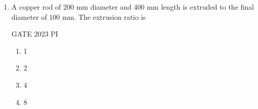 \documentclass[journal,12pt,onecolumn]{IEEEtran}
\theoremstyle{remark}
\begin{document}
\begin{enumerate}
\begin{multicols}{2}
\begin{enumerate}
    \item $
    \begin{bmatrix}
    1 & 0 & 5 \\
    0 & 1 & 10 \\
    0 & 0 & 1
    \end{bmatrix}
    $
    \item $
    \begin{bmatrix}
    1 & 0 & 10 \\
    0 & 1 & 5 \\
    0 & 0 & 1
    \end{bmatrix}
    $
    \item $
    \begin{bmatrix}
    5 & 0 & 0 \\
    0 & 10 & 0 \\
    0 & 0 & 1
    \end{bmatrix}
    $
    \item $
    \begin{bmatrix}
    10 & 0 & 0 \\
    0 & 5 & 0 \\
    0 & 0 & 1
    \end{bmatrix}
    $
\end{enumerate}
\end{multicols}
\item A copper rod of 200 mm diameter and 400 mm length is extruded to the final diameter of 100 mm. The extrusion ratio is

\hfill{GATE 2023 PI}

\begin{multicols}{2}
\begin{enumerate}
    \item 1
    \item 2
    \item 4
    \item 8
\end{enumerate}
\end{multicols}


\end{enumerate}
\end{document}
